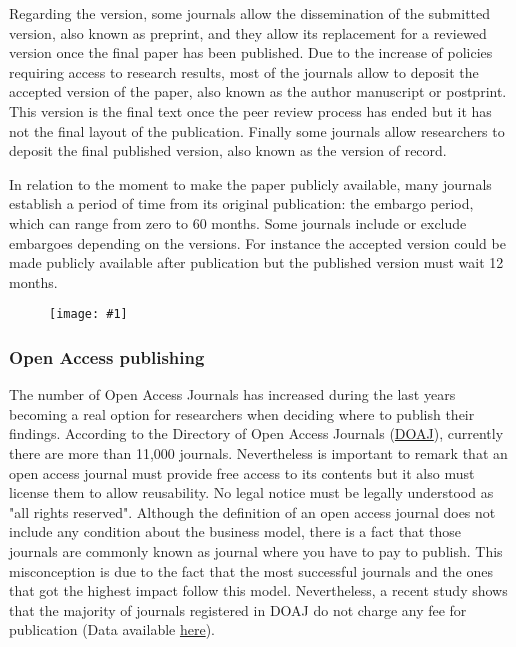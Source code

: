 \documentclass{article}
\newlength{\imgwidth}
\newcommand\scaledgraphics[2]{%
                
\settowidth{\imgwidth}{\texttt{[image: \#1]}}%
                
\setlength{\imgwidth}{\minof{\imgwidth}{#2\textwidth}}%
                
\texttt{[image: \#1]}%
                
}
\begin{document}
Regarding the version, some journals allow the dissemination of the submitted version, also known as preprint, and they allow its replacement for a reviewed version once the final paper has been published. Due to the increase of policies requiring access to research results, most of the journals allow to deposit the accepted version of the paper, also known as the author manuscript or postprint. This version is the final text once the peer review process has ended but it has not the final layout of the publication. Finally some journals allow researchers to deposit the final published version, also known as the version of record.


In relation to the moment to make the paper publicly available, many journals establish a period of time from its original publication: the embargo period, which can range from zero to 60 months. Some journals include or exclude embargoes depending on the versions. For instance the accepted version could be made publicly available after publication but the published version must wait 12 months.

\begin{figure}
\scaledgraphics{0552dd1a-2714-4599-8afd-df4cad5565c1.png}{1}
\label{F18850851}
\end{figure}


\subsubsection{\textbf{Open Access publishing}}\label{H3426161}



The number of Open Access Journals has increased during the last years becoming a real option for researchers when deciding where to publish their findings. According to the Directory of Open Access Journals (\href{http://www.doaj.org/}{DOAJ}), currently there are more than 11,000 journals. Nevertheless is important to remark that an open access journal must provide free access to its contents but it also must license them to allow reusability. No legal notice must be legally understood as "all rights reserved". Although the definition of an open access journal does not include any condition about the business model, there is a fact that those journals are commonly known as journal where you have to pay to publish. This misconception is due to the fact that the most successful journals and the ones that got the highest impact follow this model. Nevertheless, a recent study shows that the majority of journals registered in DOAJ do not charge any fee for publication (Data available \href{https://sustainingknowledgecommons.org/2018/02/06/doaj-apc-information-as-of-jan-31-2018/}{here}).
\end{document}
